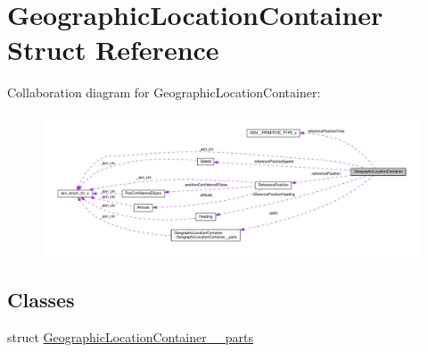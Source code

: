 \hypertarget{structGeographicLocationContainer}{}\section{Geographic\+Location\+Container Struct Reference}
\label{structGeographicLocationContainer}


Collaboration diagram for Geographic\+Location\+Container\+:\nopagebreak
\begin{figure}[H]
\begin{center}
\leavevmode
\includegraphics[width=350pt]{structGeographicLocationContainer__coll__graph}
\end{center}
\end{figure}
\subsection*{Classes}
\begin{DoxyCompactItemize}
\item 
struct \hyperlink{structGeographicLocationContainer_1_1GeographicLocationContainer____parts}{Geographic\+Location\+Container\+\_\+\+\_\+parts}
\end{DoxyCompactItemize}
